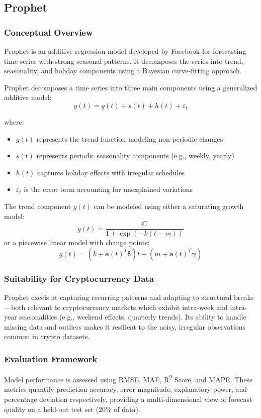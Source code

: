 \documentclass[conference]{IEEEtran}
\begin{document}
\subsection{Prophet}

\subsubsection{Conceptual Overview}
Prophet is an additive regression model developed by Facebook for forecasting time series with strong seasonal patterns. It decomposes the series into trend, seasonality, and holiday components using a Bayesian curve-fitting approach.

Prophet decomposes a time series into three main components using a generalized additive model:
$$y(t) = g(t) + s(t) + h(t) + \varepsilon_t$$

where:
\begin{itemize}
    \item $g(t)$ represents the trend function modeling non-periodic changes
    \item $s(t)$ represents periodic seasonality components (e.g., weekly, yearly)
    \item $h(t)$ captures holiday effects with irregular schedules
    \item $\varepsilon_t$ is the error term accounting for unexplained variations
\end{itemize}

The trend component $g(t)$ can be modeled using either a saturating growth model:
$$g(t) = \frac{C}{1 + \exp(-k(t-m))}$$
or a piecewise linear model with change points:
$$g(t) = (k + \boldsymbol{a}(t)^T \boldsymbol{\delta})t + (m + \boldsymbol{a}(t)^T \boldsymbol{\gamma})$$

\subsubsection{Suitability for Cryptocurrency Data}
Prophet excels at capturing recurring patterns and adapting to structural breaks---both relevant to cryptocurrency markets which exhibit intra-week and intra-year seasonalities (e.g., weekend effects, quarterly trends). Its ability to handle missing data and outliers makes it resilient to the noisy, irregular observations common in crypto datasets.

\subsubsection{Evaluation Framework}
Model performance is assessed using RMSE, MAE, R\textsuperscript{2} Score, and MAPE. These metrics quantify prediction accuracy, error magnitude, explanatory power, and percentage deviation respectively, providing a multi-dimensional view of forecast quality on a held-out test set (20\% of data).
\end{document}
